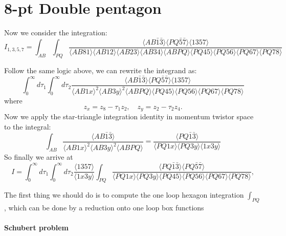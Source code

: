 \documentclass[10pt]{article}
\def\<{\langle}
\def\>{\rangle}
\begin{document}
\section{8-pt Double pentagon}
Now we consider the integration:
\begin{equation}
I_{1,3,5,7}=\int_{AB}\int_{PQ}\frac{\<AB\bar1\bar3\>\<PQ\bar5\bar7\>\<1357\>}{\<AB81\>\<AB12\>\<AB23\>\<AB34\>\<ABPQ\>\<PQ45\>\<PQ56\>\<PQ67\>\<PQ78\>}
\end{equation}

Follow the same logic above, we can rewrite the integrand as:
\begin{equation}
\int_0^{\infty}d\tau_1\int_0^{\infty}d\tau_2\frac{\<AB\bar1\bar3\>\<PQ\bar5\bar7\>\<1357\>}{\<AB1x\>^2\<AB3y\>^2\<ABPQ\>\<PQ45\>\<PQ56\>\<PQ67\>\<PQ78\>}
\end{equation}
where 
\[
    z_x=z_8-\tau_1 z_2,\quad z_y=z_2-\tau_2 z_4.
\]
Now we apply the star-triangle integration identity in momentum twistor space to the integral:
\begin{equation}
\int_{AB}\frac{\<AB\bar{1}\bar{3}\>}{\<AB1x\>^2\<AB3y\>^2\<ABPQ\>}=\frac{\<PQ\bar{1}\bar{3}\>}{\<PQ1x\>\<PQ3y\>\<1x3y\>}
\end{equation}
So finally we arrive at
\[
    I=\int_0^{\infty}d\tau_1\int_0^{\infty}d\tau_2\frac{\<1357\>}{\<1x3y\>}\int_{PQ}\frac{\< PQ\bar1\bar3\> \<PQ\bar5\bar7\>}{\<PQ1x\>\<PQ3y\>\<PQ45\>\<PQ56\>\<PQ67\>\<PQ78\>},
\]

The first thing we should do is to compute the one loop hexagon integration $\int_{PQ}$, which can be done by a reduction onto one loop box functions
\paragraph{Schubert problem}
\end{document}

